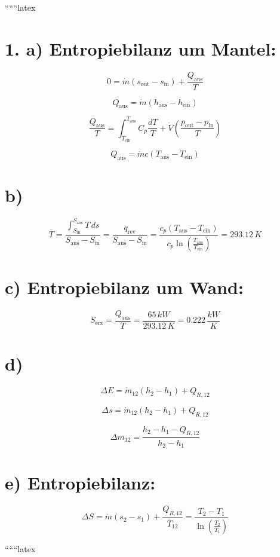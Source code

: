 
``````latex


\section*{1. a) Entropiebilanz um Mantel:}

\[
0 = \dot{m} (s_{\text{out}} - s_{\text{in}}) + \frac{Q_{\text{aus}}}{T}
\]

\[
Q_{\text{aus}} = \dot{m} (h_{\text{aus}} - h_{\text{ein}})
\]

\[
\frac{Q_{\text{aus}}}{T} = \int_{T_{\text{ein}}}^{T_{\text{aus}}} C_p \frac{dT}{T} + \dot{V} \left( \frac{p_{\text{out}} - p_{\text{in}}}{T} \right)
\]

\[
Q_{\text{aus}} = \dot{m} c (T_{\text{aus}} - T_{\text{ein}})
\]

\section*{b)}

\[
\overline{T} = \frac{\int_{S_{\text{in}}}^{S_{\text{aus}}} T \, ds}{S_{\text{aus}} - S_{\text{in}}} = \frac{q_{\text{rev}}}{S_{\text{aus}} - S_{\text{in}}} = \frac{c_p (T_{\text{aus}} - T_{\text{ein}})}{c_p \ln \left( \frac{T_{\text{aus}}}{T_{\text{ein}}} \right)} = 293.12 \, K
\]

\section*{c) Entropiebilanz um Wand:}

\[
S_{\text{erz}} = \frac{Q_{\text{aus}}}{T} = \frac{65 \, kW}{293.12 \, K} = 0.222 \, \frac{kW}{K}
\]

\section*{d)}

\[
\Delta E = \dot{m}_{12} (h_2 - h_1) + Q_{R,12}
\]

\[
\Delta s = \dot{m}_{12} (h_2 - h_1) + Q_{R,12}
\]

\[
\Delta m_{12} = \frac{h_2 - h_1 - Q_{R,12}}{h_2 - h_1}
\]

\section*{e) Entropiebilanz:}

\[
\Delta S = \dot{m} (s_2 - s_1) + \frac{Q_{R,12}}{\overline{T}_{12}} = \frac{T_2 - T_1}{\ln \left( \frac{T_2}{T_1} \right)}
\]

``````latex


